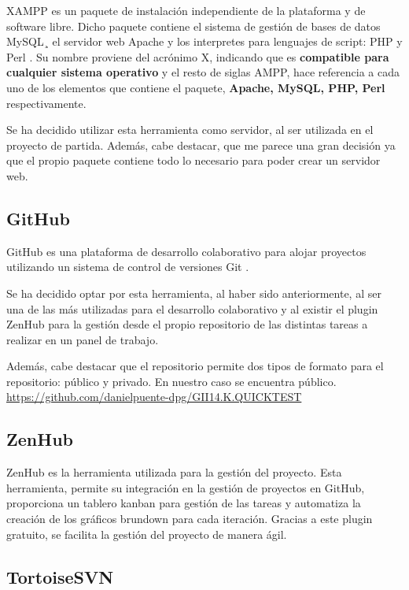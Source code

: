 XAMPP es un paquete de instalación independiente de la plataforma y de software libre. Dicho paquete contiene el sistema de gestión de bases de datos MySQL¸ el servidor web Apache y los interpretes para lenguajes de script: PHP y Perl \cite{wiki:xampp}. Su nombre proviene del acrónimo X, indicando que es \textbf{compatible para cualquier sistema operativo} y el resto de siglas AMPP, hace referencia a cada uno de los elementos que contiene el paquete, \textbf{Apache, MySQL, PHP, Perl} respectivamente.

Se ha decidido utilizar esta herramienta como servidor, al ser utilizada en el proyecto de partida. Además, cabe destacar, que me parece una gran decisión ya que el propio paquete contiene todo lo necesario para poder crear un servidor web.

\subsection{GitHub}

GitHub es una plataforma de desarrollo colaborativo para alojar proyectos utilizando un sistema de control de versiones Git \cite{wiki:github}.

Se ha decidido optar por esta herramienta, al haber sido anteriormente, al ser una de las más utilizadas para el desarrollo colaborativo y al existir el plugin ZenHub para la gestión desde el propio repositorio de las distintas tareas a realizar en un panel de trabajo.
 
Además, cabe destacar que el repositorio permite dos tipos de formato para el repositorio: público y privado. En nuestro caso se encuentra público. \url{https://github.com/danielpuente-dpg/GII14.K.QUICKTEST}

\subsection{ZenHub}\label{zenhub}

ZenHub es la herramienta utilizada para la gestión del proyecto.  Esta herramienta, permite su integración en la gestión de proyectos en GitHub, proporciona un tablero kanban para gestión de las tareas y automatiza la creación de los gráficos brundown para cada iteración. Gracias a este plugin gratuito, se facilita la gestión del proyecto de manera ágil. \cite{wiki:zenhub}

\subsection{TortoiseSVN}

